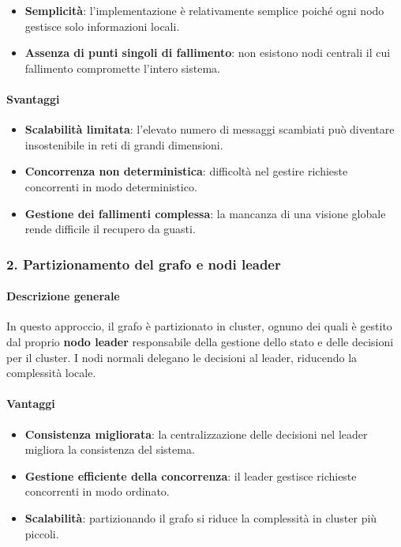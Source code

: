 \documentclass[12pt, a4paper]{report}
\begin{document}
\begin{itemize}
    \item \textbf{Semplicit\`a}: l'implementazione \`e relativamente semplice poich\'e ogni nodo gestisce solo informazioni locali.
    \item \textbf{Assenza di punti singoli di fallimento}: non esistono nodi centrali il cui fallimento compromette l'intero sistema.
\end{itemize}

\paragraph{Svantaggi}

\begin{itemize}
    \item \textbf{Scalabilit\`a limitata}: l'elevato numero di messaggi scambiati pu\`o diventare insostenibile in reti di grandi dimensioni.
    \item \textbf{Concorrenza non deterministica}: difficolt\`a nel gestire richieste concorrenti in modo deterministico.
    \item \textbf{Gestione dei fallimenti complessa}: la mancanza di una visione globale rende difficile il recupero da guasti.
\end{itemize}

\subsubsection{2. Partizionamento del grafo e nodi leader}

\paragraph{Descrizione generale}
\begin{flushleft}
In questo approccio, il grafo \`e partizionato in cluster, ognuno dei quali \`e gestito dal proprio \textbf{nodo leader} responsabile della gestione dello stato e delle decisioni per il cluster. I nodi normali delegano le decisioni al leader, riducendo la complessit\`a locale.
\end{flushleft}
\paragraph{Vantaggi}

\begin{itemize}
    \item \textbf{Consistenza migliorata}: la centralizzazione delle decisioni nel leader migliora la consistenza del sistema.
    \item \textbf{Gestione efficiente della concorrenza}: il leader gestisce richieste concorrenti in modo ordinato.
    \item \textbf{Scalabilit\`a}: partizionando il grafo si riduce la complessit\`a in cluster pi\`u piccoli.
\end{itemize}
\end{document}
